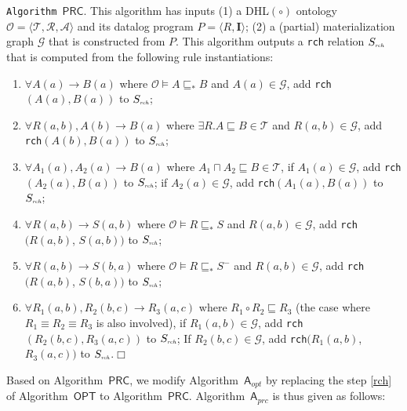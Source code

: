 \documentclass[final,1p,times]{elsarticle}
\begin{document}
\noindent\texttt{Algorithm~$\mathsf{PRC}$}. This algorithm has inputs (1)
a DHL$(\circ)$ ontology $\mathcal{O}=\langle\mathcal{T},\mathcal{R},\mathcal{A}\rangle$
and its datalog program $P=\langle R, \textbf{I}\rangle$;
(2) a (partial) materialization graph $\mathcal{G}$ that is constructed from $P$.
This algorithm outputs a \texttt{rch} relation $S_{\textit{\tiny rch}}$ that
is computed from the following rule instantiations:

\begin{enumerate}[leftmargin=4ex,label=$\bullet$]
\item $\forall A(a)\rightarrow B(a)$ where $\mathcal{O}\models A\sqsubseteq_* B$ and $A(a)\in\mathcal{G}$,
    add \texttt{rch}$(A(a),B(a))$ to $S_{\textit{\tiny rch}}$;

\item $\forall R(a,b),A(b)\rightarrow B(a)$ where $\exists R.A\sqsubseteq B\in\mathcal{T}$
    and $R(a,b)\in\mathcal{G}$, add \texttt{rch}$(A(b),B(a))$ to $S_{\textit{\tiny rch}}$;

\item $\forall A_1(a),A_2(a)\rightarrow B(a)$ where $A_1\sqcap A_2\sqsubseteq B\in\mathcal{T}$,
    if $A_1(a)\in\mathcal{G}$, add \texttt{rch}$(A_2(a),B(a))$ to $S_{\textit{\tiny rch}}$;
    if $A_2(a)\in\mathcal{G}$, add \texttt{rch}$(A_1(a),B(a))$ to $S_{\textit{\tiny rch}}$;

\item $\forall R(a,b)\rightarrow S(a,b)$ where $\mathcal{O}\models R\sqsubseteq_* S$ and $R(a,b)\in\mathcal{G}$,
    add \texttt{rch}$(R(a,b)$, $S(a,b))$ to $S_{\textit{\tiny rch}}$;

\item $\forall R(a,b)\rightarrow S(b,a)$ where $\mathcal{O}\models R\sqsubseteq_* S^-$
    and $R(a,b)\in\mathcal{G}$, add \texttt{rch}$(R(a,b)$, $S(b,a))$ to $S_{\textit{\tiny rch}}$;

\item $\forall R_1(a,b),R_2(b,c)\rightarrow R_3(a,c)$ where $R_1\circ R_2\sqsubseteq R_3$ (the case
    where $R_1\equiv R_2\equiv R_3$ is also involved),
    if $R_1(a,b)\in\mathcal{G}$, add \texttt{rch}$(R_2(b,c),R_3(a,c))$ to $S_{\textit{\tiny rch}}$;
    If $R_2(b,c)\in\mathcal{G}$, add \texttt{rch}$(R_1(a,b)$, $R_3(a,c))$ to $S_{\textit{\tiny rch}}$.\hfill$\Box$
\end{enumerate}

Based on Algorithm~$\mathsf{PRC}$, we modify Algorithm~$\mathsf{A}_{opt}$
by replacing the step \ref{rch} of Algorithm~$\mathsf{OPT}$
to Algorithm~$\mathsf{PRC}$. Algorithm~$\mathsf{A}_{prc}$
is thus given as follows:\\
\end{document}
